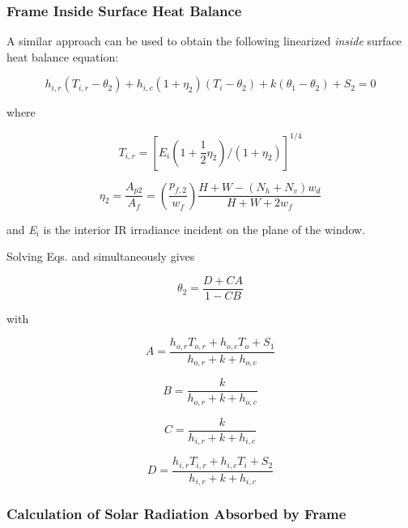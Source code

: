 \subsubsection{Frame Inside Surface Heat Balance}\label{frame-inside-surface-heat-balance}

A similar approach can be used to obtain the following linearized \emph{inside} surface heat balance equation:

\begin{equation}
{h_{i,r}}({T_{i,r}} - {\theta_2}) + {h_{i,c}}(1 + {\eta_2})({T_i} - {\theta_2}) + k({\theta_1} - {\theta_2}) + {S_2} = 0
\end{equation}

where

\begin{equation}
{T_{i,r}} = {[{E_i}(1 + \frac{1}{2}{\eta_2})/(1 + {\eta_2})]^{1/4}}
\end{equation}

\begin{equation}
{\eta_2} = \frac{{{A_{p2}}}}{{{A_f}}} = \left( {\frac{{{p_{f,2}}}}{{{w_f}}}} \right)\frac{{H + W - ({N_h} + {N_v}){w_d}}}{{H + W + 2{w_f}}}
\end{equation}

and \emph{E\(_{i}\)} is the interior IR irradiance incident on the plane of the window.

Solving Eqs. and simultaneously gives

\begin{equation}
{\theta_2} = \frac{{D + CA}}{{1 - CB}}
\end{equation}

with

\begin{equation}
A = \frac{{{h_{o,r}}{T_{o,r}} + {h_{o,c}}{T_o} + {S_1}}}{{{h_{o,r}} + k + {h_{o,c}}}}
\end{equation}

\begin{equation}
B = \frac{k}{{{h_{o,r}} + k + {h_{o,c}}}}
\end{equation}

\begin{equation}
C = \frac{k}{{{h_{i,r}} + k + {h_{i,c}}}}
\end{equation}

\begin{equation}
D = \frac{{{h_{i,r}}{T_{i,r}} + {h_{i,c}}{T_i} + {S_2}}}{{{h_{i,r}} + k + {h_{i,c}}}}
\end{equation}

\subsubsection{Calculation of Solar Radiation Absorbed by Frame}\label{calculation-of-solar-radiation-absorbed-by-frame}

